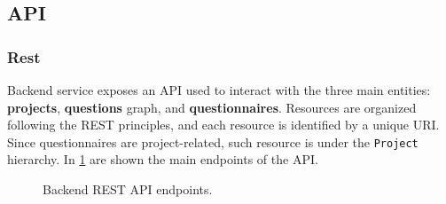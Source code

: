 \documentclass[12pt,a4paper,openright,twoside]{book}
\begin{document}
\subsection{\acs{API}}

\subsubsection{Rest}

Backend service exposes an \ac{API} used to interact with the three main entities: \textbf{projects}, \textbf{questions} graph, and \textbf{questionnaires}.
%
Resources are organized following the REST principles, and each resource is identified by a unique URI.
%
Since questionnaires are project-related, such resource is under the \texttt{Project} hierarchy.
%
In \cref{fig:rest-api} are shown the main endpoints of the \ac{API}.


\begin{figure}
    \centering
    \hfill
    \hfill
    
    \caption{Backend REST \ac{API} endpoints.}
    \label{fig:rest-api}
\end{figure}
\end{document}
